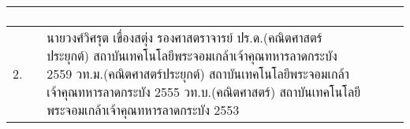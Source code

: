 {\begin{center}
\begin{longtable}{|p{}|p{}|p{}|}
\begin{enumerate}[series=tar]
\end{enumerate}
\\ \hline
2. &
นายวงศ์วิศรุต เขื่องสตุ่ง \newline 
รองศาสตราจารย์	\newline
ปร.ด.(คณิตศาสตร์ประยุกต์) \newline สถาบันเทคโนโลยีพระจอมเกล้าเจ้าคุณทหารลาดกระบัง 2559 \newline
วท.ม.(คณิตศาสตร์ประยุกต์) \newline สถาบันเทคโนโลยีพระจอมเกล้าเจ้าคุณทหารลาดกระบัง 2555  \newline
วท.บ.(คณิตศาสตร์) \newline สถาบันเทคโนโลยีพระจอมเกล้าเจ้าคุณทหารลาดกระบัง 2553
& 
\begin{enumerate}[series=note]

\end{enumerate}
\end{longtable}
\end{center}}
